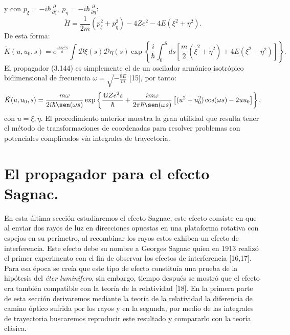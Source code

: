 y con $	p_{\xi}=-i\hbar\frac{\partial}{\partial\xi},\ p_{\eta}=-i\hbar\frac{\partial}{\partial\eta} $:
\begin{equation}
\tilde{H}=\frac{1}{2m}\left(p_{\xi}^{2}+p_{\eta}^{2}\right)-4Ze^{2}-4E(\xi^{2}+\eta^{2}).
\end{equation}
De esta forma:
\begin{equation}
\tilde{K}(u,u_{0},s)=e^{\frac{4iZe^{2}S}{\hbar}}\int\mathcal{D}\xi(s)\mathcal{D}\eta(s)\exp\left\{ \frac{i}{\hbar}\int_{0}^{S}ds\left[\frac{m}{2}(\dot{\xi}^{2}+\dot{\eta}^{2})+4E(\xi^{2}+\eta^{2})\right]\right\} .
\end{equation} 
El propagador (3.144) es simplemente el de un oscilador armónico isotrópico bidimensional de frecuencia $\omega=\sqrt{-\frac{8E}{m}}$ [15], por tanto:
\begin{equation}
\tilde{K}(u,u_{0},s)=\frac{m\omega}{2i\hbar\sen(\omega s)}\exp\left\{ \frac{4iZe^{2}s}{\hbar}+\frac{im\omega}{2\pi\hbar\sen(\omega s)}\left[(u^{2}+u_{0}^{2})\cos(\omega s)-2uu_{0}\right]\right\}, 
\end{equation}
con $u={\xi ,\eta}$. El procedimiento anterior muestra la gran utilidad que resulta tener el método de transformaciones de coordenadas para resolver problemas con potenciales complicados vía integrales de trayectoria.
\newpage






\section{El propagador para el efecto Sagnac.}
En esta última sección estudiaremos el efecto Sagnac, este efecto consiste en que al enviar dos rayos de luz en  direcciones opuestas en una plataforma rotativa con espejos en su perímetro, al recombinar los rayos estos exhiben un efecto de interferencia. Este efecto debe su nombre a Georges Sagnac quíen en 1913 realizó el primer experimento con el fin de observar los efectos de interferencia [16,17]. Para esa época se creía que este tipo de efecto constituía una prueba de la hipótesis del \textit{éter luminifero}, sin embargo, tiempo después se mostró que el efecto era también compatible con la teoría de la relatividad [18]. En la primera parte de esta sección derivaremos mediante la teoría de la relatividad la diferencia de camino óptico sufrida por los rayos y en la segunda, por medio de las integrales de trayectoria buscaremos reproducir este resultado y compararlo con la teoría clásica.
	 
